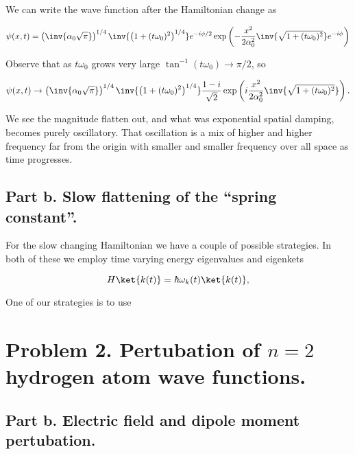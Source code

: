 We can write the wave function after the Hamiltonian change as

\begin{equation}\label{eqn:qmTwoExamReflection:310b}
\psi(x, t) = 
\left( \inv{\alpha_0 \sqrt{\pi}} \right)^{1/4}
\inv{\left( 1 + (t \omega_0)^2 \right)^{1/4}}
e^{-i \phi/2}
\exp\left(
-\frac{x^2}{2 \alpha_0^2} \inv{\sqrt{1 + (t \omega_0)^2}} e^{-i \phi}
\right)
\end{equation}

Observe that as $t \omega_0$ grows very large $\tan^{-1}(t \omega_0) \rightarrow \pi/2$, so 

\begin{equation}\label{eqn:qmTwoExamReflection:310c}
\psi(x, t) \rightarrow
\left( \inv{\alpha_0 \sqrt{\pi}} \right)^{1/4}
\inv{\left( 1 + (t \omega_0)^2 \right)^{1/4}}
\frac{1 - i}{\sqrt{2}}
\exp\left(
i\frac{x^2}{2 \alpha_0^2} \inv{\sqrt{1 + (t \omega_0)^2}} 
\right).
\end{equation}

We see the magnitude flatten out, and what was exponential spatial damping, becomes purely oscillatory.  That oscillation is a mix of higher and higher frequency far from the origin with smaller and smaller frequency over all space as time progresses.

\subsection{Part b.  Slow flattening of the ``spring constant''.}

For the slow changing Hamiltonian we have a couple of possible strategies.  In both of these we employ time varying energy eigenvalues and eigenkets

\begin{equation}\label{eqn:qmTwoExamReflection:n}
H \ket{k(t)} = \hbar \omega_k(t) \ket{k(t)},
\end{equation}

One of our strategies is to use 

\section{Problem 2.  Pertubation of $n=2$ hydrogen atom wave functions.}

\subsection{Part b.  Electric field and dipole moment pertubation.}

